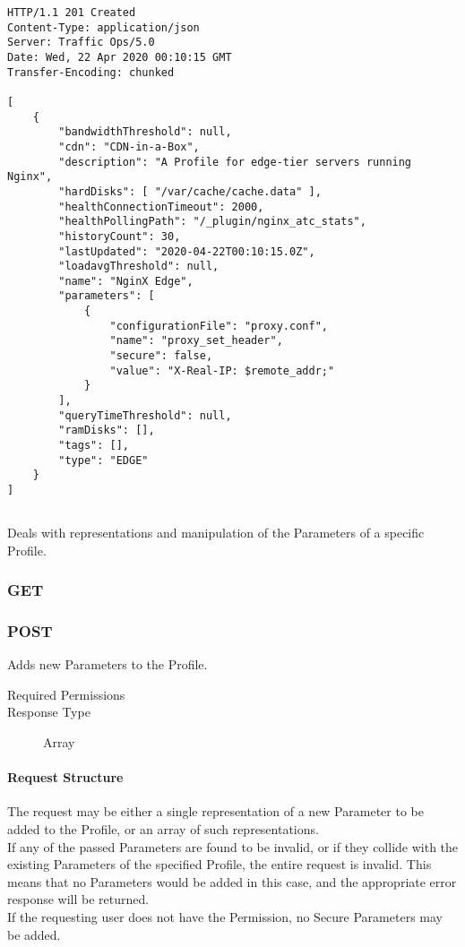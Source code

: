 \begin{codelisting}
\begin{verbatim}
HTTP/1.1 201 Created
Content-Type: application/json
Server: Traffic Ops/5.0
Date: Wed, 22 Apr 2020 00:10:15 GMT
Transfer-Encoding: chunked

[
	{
		"bandwidthThreshold": null,
		"cdn": "CDN-in-a-Box",
		"description": "A Profile for edge-tier servers running Nginx",
		"hardDisks": [ "/var/cache/cache.data" ],
		"healthConnectionTimeout": 2000,
		"healthPollingPath": "/_plugin/nginx_atc_stats",
		"historyCount": 30,
		"lastUpdated": "2020-04-22T00:10:15.0Z",
		"loadavgThreshold": null,
		"name": "NginX Edge",
		"parameters": [
			{
				"configurationFile": "proxy.conf",
				"name": "proxy_set_header",
				"secure": false,
				"value": "X-Real-IP: $remote_addr;"
			}
		],
		"queryTimeThreshold": null,
		"ramDisks": [],
		"tags": [],
		"type": "EDGE"
	}
]
\end{verbatim}
\end{codelisting}

\subsection{}

\subsection{}
Deals with representations and manipulation of the Parameters of a specific
Profile.

\subsubsection{GET}

\subsubsection{POST}
Adds new Parameters to the Profile.

\begin{description}
	\item[Required Permissions] 
	\item[Response Type] Array
\end{description}

\paragraph{Request Structure}
The request may be either a single representation of a new Parameter to be added
to the Profile, or an array of such representations.\\
If any of the passed Parameters are found to be invalid, or if they collide with
the existing Parameters of the specified Profile, the entire request is invalid.
This means that no Parameters would be added in this case, and the appropriate
error response will be returned.\\
If the requesting user does not have the  Permission,
no Secure Parameters may be added.

